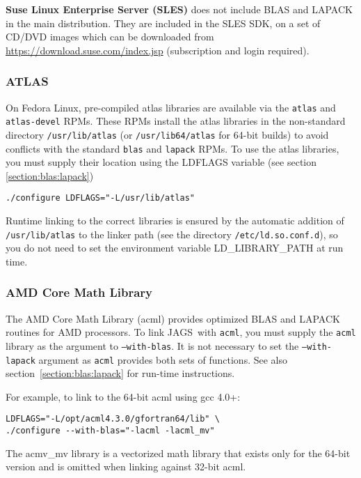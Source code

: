 \documentclass[11pt, a4paper, titlepage]{article}
\newcommand{\JAGS}{\textsf{JAGS}}
\newcommand{\code}[1]{{\bgroup{\normalfont\ttfamily #1}\egroup}}
\begin{document}
{\bf Suse Linux Enterprise Server (SLES)} does not include BLAS and
LAPACK in the main distribution. They are included in the SLES SDK, on
a set of CD/DVD images which can be downloaded from
\url{https://download.suse.com/index.jsp} (subscription and login
required).

\subsubsection{ATLAS}

On Fedora Linux, pre-compiled atlas libraries are available via the
\texttt{atlas} and \texttt{atlas-devel} RPMs.  These RPMs install the
atlas libraries in the non-standard directory \texttt{/usr/lib/atlas}
(or \texttt{/usr/lib64/atlas} for 64-bit builds) to avoid conflicts
with the standard \texttt{blas} and \texttt{lapack} RPMs. To use the
atlas libraries, you must supply their location using the
\code{LDFLAGS} variable (see section \ref{section:blas:lapack})
\begin{verbatim}
./configure LDFLAGS="-L/usr/lib/atlas"
\end{verbatim}
Runtime linking to the correct libraries is ensured by the automatic
addition of \texttt{/usr/lib/atlas} to the linker path (see the directory
\texttt{/etc/ld.so.conf.d}), so you do not need to set the
environment variable \code{LD\_LIBRARY\_PATH} at run time.

\subsubsection{AMD Core Math Library}
\label{section:acml:linux}

The AMD Core Math Library (acml) provides optimized BLAS and LAPACK
routines for AMD processors. To link \JAGS\ with \texttt{acml}, you must
supply the \texttt{acml} library as the argument to \texttt{--with-blas}.
It is not necessary to set the \texttt{--with-lapack} argument
as \texttt{acml} provides both sets of functions. See also
section~\ref{section:blas:lapack} for run-time instructions.

For example, to link to the 64-bit acml using gcc 4.0+:
\begin{verbatim}
LDFLAGS="-L/opt/acml4.3.0/gfortran64/lib" \
./configure --with-blas="-lacml -lacml_mv" 
\end{verbatim}
The \code{acmv\_mv} library is a vectorized math library that
exists only for the 64-bit version and is omitted when linking against
32-bit acml.
\end{document}
